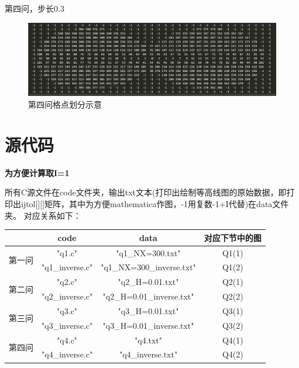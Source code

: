 \documentclass[10pt, a4paper]{article}
\begin{document}
    第四问，步长0.3

    \begin{figure}[H]
        \centering
        \includegraphics[width=1.0\textwidth]{第四问格点划分示意.png}
        \caption{第四问格点划分示意}\label{fig:第四问格点划分示意}
    \end{figure}

    \section{源代码}

    \textbf{为方便计算取I=1}


    所有C源文件在code文件夹，输出txt文本(打印出绘制等高线图的原始数据，即打印出ijtol[][]矩阵，其中为方便mathematica作图，-1用复数-1+I代替)在data文件夹。
    对应关系如下：

    \begin{table}[H]
        \centering
        \begin{tabular}{|c|c|c|c|}
            \hline
                        & code            & data                      & 对应下节中的图 \\ \hline
            \multirow{2}{*}{第一问} & "q1.c"          & "q1\_NX=300.txt"          & Q1(1)   \\ \cline{2-4} 
                        & "q1\_inverse.c" & "q1\_NX=300\_inverse.txt" & Q1(2)   \\ \hline
            \multirow{2}{*}{第二问} & "q2.c"          & "q2\_H=0.01.txt"          & Q2(1)   \\ \cline{2-4} 
                        & "q2\_inverse.c" & "q2\_H=0.01\_inverse.txt" & Q2(2)   \\ \hline
            \multirow{2}{*}{第三问} & "q3.c"          & "q3\_H=0.01.txt"          & Q3(1)   \\ \cline{2-4} 
                        & "q3\_inverse.c" & "q3\_H=0.01\_inverse.txt" & Q3(2)   \\ \hline
            \multirow{2}{*}{第四问} & "q4.c"          & "q4.txt"                  & Q4(1)   \\ \cline{2-4} 
                        & "q4\_inverse.c" & "q4\_inverse.txt"         & Q4(2)   \\ \hline
        \end{tabular}
        \end{table}
\end{document}
